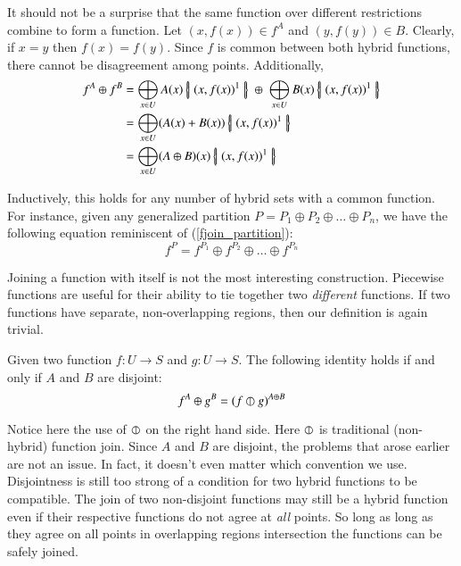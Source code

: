 It should not be a surprise that the same function over different restrictions combine to form a function.
Let $(x,f(x)) \in f^A$ and $(y,f(y)) \in B$. Clearly, if $x=y$ then $f(x)=f(y)$. 
Since $f$ is common between both hybrid functions, there cannot be disagreement among points.
Additionally,
\begin{align}
	f^A \oplus f^B 
		&= \bigoplus_{x \in U} A(x) \hset{ (x, f(x) )^1 } 
			\; \oplus \; \bigoplus_{x \in U} B(x) \hset{ (x, f(x) )^1 } \notag \\
		&= \bigoplus_{x \in U} (A(x) + B(x)) \hset{ (x, f(x) )^1 } \notag \\
		&= \bigoplus_{x \in U} (A \oplus B)(x) \hset{ (x, f(x) )^1 }
\end{align}


Inductively, this holds for any number of hybrid sets with a common function.
For instance, given any generalized partition $P = P_1 \oplus P_2 \oplus \ldots \oplus P_n$, 
we have the following equation reminiscent of (\ref{fjoin_partition}):
\begin{equation}
 	f^P = f^{P_1} \oplus f^{P_2} \oplus \ldots \oplus f^{P_n}
\end{equation}


Joining a function with itself is not the most interesting construction.
Piecewise functions are useful for their ability to tie together two \emph{different} functions.
If two functions have separate, non-overlapping regions, then our definition is again trivial.


\begin{theorem}
	Given two function $f : U \to S$ and $g : U \to S$. The following identity holds if and only if $A$ and $B$ are disjoint:
	\begin{equation}
		f^A \oplus g^B = (f \varobar g)^{A \oplus B}
	\end{equation}
\end{theorem}


Notice here the use of $\varobar$ on the right hand side.
Here $\varobar$ is traditional (non-hybrid) function join.
Since $A$ and $B$ are disjoint, the problems that arose earlier are not an issue.
In fact, it doesn't even matter which convention we use.
Disjointness is still too strong of a condition for two hybrid functions to be compatible.
The join of two non-disjoint functions may still be a hybrid function 
even if their respective functions do not agree at \emph{all} points.
So long as long as they agree on all points in overlapping regions intersection the functions can be safely joined.


